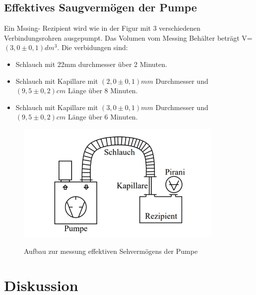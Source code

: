 \documentclass[12pt]{article}
\begin{document}
	\subsection{Effektives Saugvermögen der Pumpe}
	Ein Mssing- Rezipient wird wie in der Figur mit 3 verschiedenen Verbindungsrohren ausgepumpt. Das Volumen vom Messing Behälter beträgt V= $(3,0\pm 0,1)dm^3$.
	Die verbidungen sind: 
	\begin{itemize}
		\item Schlauch mit 22mm durchmesser über 2 Minuten.
		\item Schlauch mit Kapillare mit $(2,0\pm 0,1)mm$ Durchmesser und $(9,5\pm 0,2)cm$ Länge über 8 Minuten. 
		\item Schlauch mit Kapillare mit $(3,0\pm 0,1)mm$ Durchmesser und $(9,5\pm 0,2)cm$ Länge über 6 Minuten.
	\end{itemize} 
	
	\begin{figure}[H]
		\centering
		\includegraphics[width=10cm]{Auspumpzeit.png}
		\label{fig: Saugvermögen }
		\caption{Aufbau zur messung effektiven Sehvermögens der Pumpe}
	\end{figure}
	
	\section{Diskussion}\label{sec:dis}
\end{document}
